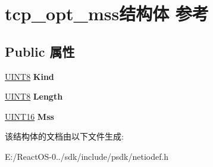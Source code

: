 \hypertarget{structtcp__opt__mss}{}\section{tcp\+\_\+opt\+\_\+mss结构体 参考}
\label{structtcp__opt__mss}
\subsection*{Public 属性}
\begin{DoxyCompactItemize}
\item 
\mbox{\label{structtcp__opt__mss_a7954e70deb98f31bc33c7788b7dee351}} 
\hyperlink{_processor_bind_8h_ab27e9918b538ce9d8ca692479b375b6a}{U\+I\+N\+T8} {\bfseries Kind}
\item 
\mbox{\label{structtcp__opt__mss_a7567aa71e78f43b6d79f4a990643258c}} 
\hyperlink{_processor_bind_8h_ab27e9918b538ce9d8ca692479b375b6a}{U\+I\+N\+T8} {\bfseries Length}
\item 
\mbox{\label{structtcp__opt__mss_a087414977e712e0f01101155e6404efc}} 
\hyperlink{_processor_bind_8h_a09f1a1fb2293e33483cc8d44aefb1eb1}{U\+I\+N\+T16} {\bfseries Mss}
\end{DoxyCompactItemize}


该结构体的文档由以下文件生成\+:\begin{DoxyCompactItemize}
\item 
E\+:/\+React\+O\+S-\/0../sdk/include/psdk/netiodef.\+h\end{DoxyCompactItemize}
